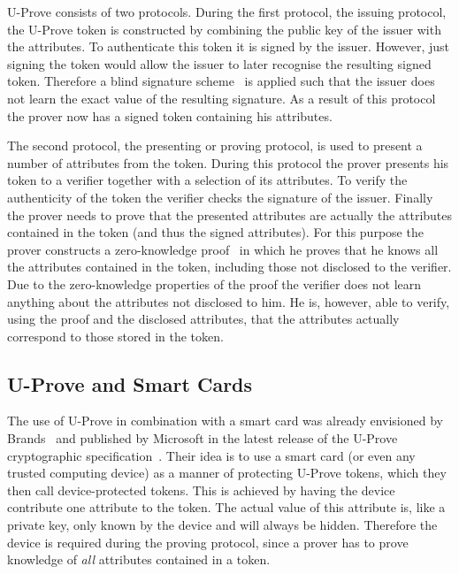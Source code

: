 U-Prove consists of two protocols. During the first protocol, the issuing protocol, the U-Prove token is
constructed by combining the public key of the issuer with the attributes. To
authenticate this token it is signed by the issuer. However, just signing the
token would allow the issuer to later recognise the resulting signed token.
Therefore a blind signature scheme~\cite{Chaum1983} is applied such that the
issuer does not learn the exact value of the resulting signature. As a result of
this protocol the prover now has a signed token containing his attributes.

The second protocol, the presenting or proving protocol, is used to present a
number of attributes from the token. During this protocol the prover presents
his token to a verifier together with a selection of its attributes. To verify
the authenticity of the token the verifier checks the signature of the issuer.
Finally the prover needs to prove that the presented attributes are actually the
attributes contained in the token (and thus the signed attributes). For this
purpose the prover constructs a zero-knowledge proof~\cite{FiatShamir1986} in
which he proves that he knows all the attributes contained in the token,
including those not disclosed to the verifier. Due to the zero-knowledge
properties of the proof the verifier does not learn anything about the
attributes not disclosed to him. He is, however, able to verify, using the proof
and the disclosed attributes, that the attributes actually correspond to those
stored in the token.

\subsection{U-Prove and Smart Cards}\label{sec:uproveandcards}

The use of U-Prove in combination with a smart card was already envisioned
by Brands~\cite{Brands2000} and published by Microsoft in the latest
release of the U-Prove cryptographic
specification~\cite{U-Prove_Crypto2011}. Their idea is to use a smart card
(or even any trusted computing device) as a manner of protecting U-Prove
tokens, which they then call device-protected tokens. This is achieved by
having the device contribute one attribute to the token. The actual value
of this attribute is, like a private key, only known by the device and will
always be hidden. Therefore the device is required during the proving
protocol, since a prover has to prove knowledge of \emph{all} attributes
contained in a token.

